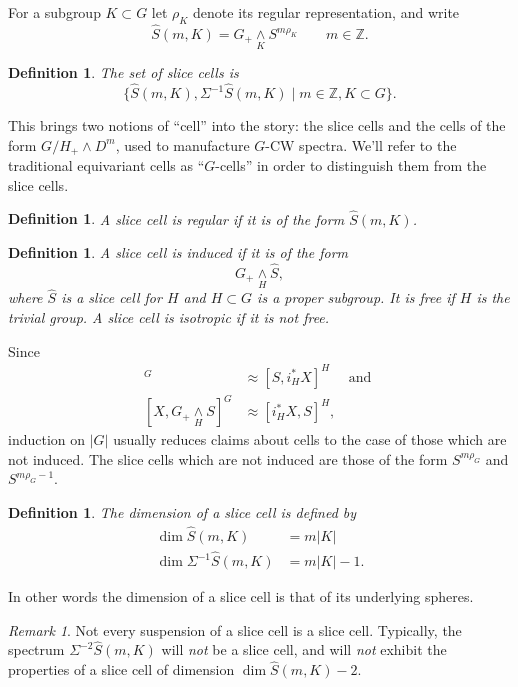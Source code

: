 \documentclass{amsart}
\newtheorem{definition}[equation]{Definition}
\newenvironment{defin}{\begin{definition}\rm}{\end{definition}}
\newtheorem{rem}[equation]{Remark}
\theoremstyle{definition}
\newtheorem{defin}[equation]{Definition}
\theoremstyle{remark}
\newtheorem{rem}[equation]{Remark}
\newcommand{\Z}{{\mathbb Z}}
\newcommand{\smashove}[1]{\underset{#1}{\wedge}}
\newcommand{\slicecell}{\widehat{S}}
\begin{document}
For a subgroup $K\subset G$ let $\rho_{K}$ denote its regular
representation, and write
\[
\slicecell(m,K)=G_{+}\smashove{K}S^{m\rho_{K}}\qquad m\in\Z.
\]

\begin{defin}
\label{def:20}
The set of  {\em slice cells} is
\[
\{\slicecell(m,K), \Sigma^{-1}\slicecell(m,K)\mid m\in \Z,
K\subset G \}.
\]
\end{defin}

This brings two notions of ``cell'' into the story: the slice cells
and the cells of the form $G/H_{+}\wedge D^{m}$, used to manufacture
$G$-CW spectra.  We'll refer to the traditional equivariant cells as
``$G$-cells'' in order to distinguish them from the slice cells.

\begin{defin}
\label{def:44}
A slice cell is {\em regular} if it is of the form $\slicecell(m,K)$. 
\end{defin}

\begin{defin}
\label{def:21}
A slice cell is {\em induced} if it is of the form
\[
G_{+}\smashove{H}\slicecell,
\]
where $\slicecell$ is a slice cell for $H$ and $H\subset G$ is a
proper subgroup.  It is {\em free} if $H$ is the trivial group.  A
slice cell is {\em isotropic} if it is not free.
\end{defin}

Since
\begin{align*}
[G_{+}\smashove{H}S,X]^{G} &\approx [S,i_{H}^{\ast}X]^{H}\quad\text{ and }  \\
[X,G_{+}\smashove{H}S]^{G} &\approx [i_{H}^{\ast}X,S]^{H},
\end{align*}
induction on $|G|$ usually reduces claims about cells to the case of
those which are not induced.  The slice cells which are not induced
are those of the form $S^{m\rho_{G}}$ and $S^{m\rho_{G}-1}$.

\begin{defin}
The {\em dimension} of a slice cell is defined by
\begin{align*}
\dim \slicecell(m,K) &=m|K| \\
\dim\Sigma^{-1}\slicecell(m,K) &= m |K|-1.
\end{align*}
\end{defin}
In other words the dimension of a slice cell is that of its underlying
spheres.

\begin{rem}
Not every suspension of a slice cell is a slice cell.  Typically, the
spectrum $\Sigma^{-2}\slicecell(m,K)$ will {\em not} be a slice
cell, and will {\em not} exhibit the properties of a slice cell of dimension
$\dim \slicecell(m,K)-2$.
\end{rem}
\end{document}

